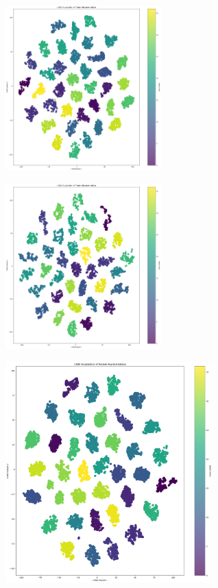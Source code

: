 \begin{multicols}{2}
\includegraphics[width=0.45\textwidth]{Assets/tSNE/RESNET152.png}

\vspace{0.8cm}

\includegraphics[width=0.45\textwidth]{Assets/tSNE/vgg16.png}

\vspace{0.8cm}

\end{multicols}


\renewcommand{\thefigure}{2.\arabic{figure}} %

\begin{center}
    \includegraphics[width=0.6\textwidth]{Assets/tSNE/CONVNEXT.png}
\end{center}


